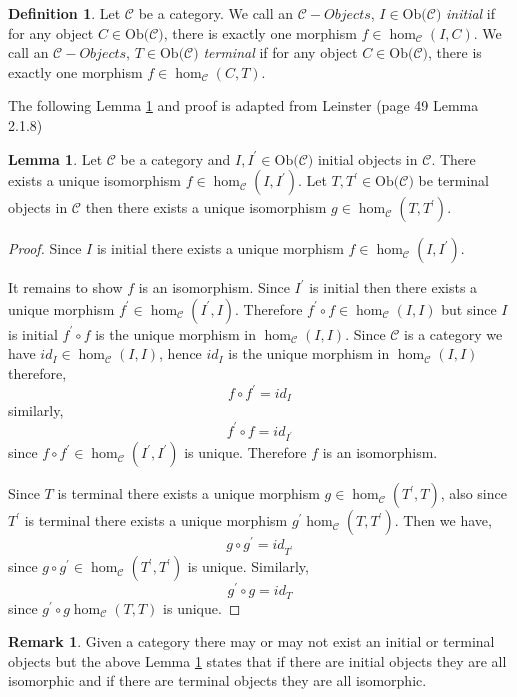 \documentclass[11pt,a4paper]{article}
\theoremstyle{definition}
\newtheorem{lemma}[thm]{Lemma}
\newtheorem{definition}[thm]{Definition}
\newtheorem{remark}[thm]{Remark}
\newcommand\ho[3][]{\hom_{#1}(#2,#3)}
\newcommand\ob[1]{\mathrm{Ob(}#1\mathrm{)}}
\newcommand\cat[1]{\mathscr{#1}}
\newcommand\objs[1]{#1-Objects}
\numberwithin{equation}{section}
\begin{document}
\begin{definition}
    \label{def:intermob}
    Let $\cat{C}$ be a category. We call an $\objs{\cat{C}}$, $I\in\ob{\cat{C}}$ \emph{initial} if for any object $C\in\ob{\cat{C}}$, there is exactly one morphism $f\in\ho[\cat{C}]{I}{C}$.  We call an $\objs{\cat{C}}$, $T\in\ob{\cat{C}}$ \emph{terminal} if for any object $C\in\ob{\cat{C}}$, there is exactly one morphism $f\in\ho[\cat{C}]{C}{T}$.
\end{definition}
The following Lemma \ref{lem:initialiso} and proof is adapted from Leinster \cite{Leinster} (page 49 Lemma 2.1.8)
\begin{lemma}
    \label{lem:initialiso} 
    Let $\cat{C}$ be a category and $I,I^\prime\in\ob{\cat{C}}$ initial objects in $\cat{C}$. There exists a unique isomorphism $f\in\ho[\cat{C}]{I}{I^\prime}$. Let $T,T^\prime\in\ob{\cat{C}}$ be terminal objects in $\cat{C}$ then there exists a unique isomorphism $g\in\ho[\cat{C}]{T}{T^\prime}$.
\end{lemma}
\begin{proof}
    Since $I$ is initial there exists a unique morphism $f\in\ho[\cat{C}]{I}{I^\prime}$. 
    
    It remains to show $f$ is an isomorphism. Since $I^\prime$ is initial then there exists a unique morphism $f^\prime\in\ho[\cat{C}]{I^\prime}{I}$. Therefore $f^\prime\circ f\in\ho[\cat{C}]{I}{I}$ but since $I$ is initial $f^\prime\circ f$ is the unique morphism in $\ho[\cat{C}]{I}{I}$. Since $\cat{C}$ is a category we have $id_{I}\in\ho[\cat{C}]{I}{I}$, hence $id_{I}$ is the unique morphism in $\ho[\cat{C}]{I}{I}$ therefore,
    \[f\circ f^\prime = id_{I}\]
    similarly,
    \[f^\prime\circ f = id_{I^\prime}\]
    since $f\circ f^\prime\in\ho[\cat{C}]{I^\prime}{I^\prime}$ is unique. Therefore $f$ is an isomorphism.
    
    Since $T$ is terminal there exists a unique morphism $g\in\ho[\cat{C}]{T^\prime}{T}$, also since $T^\prime$ is terminal there exists a unique morphism $g^\prime\ho[\cat{C}]{T}{T^\prime}$. Then we have,
    \[g\circ g^\prime = id_{T^\prime}\]
    since $g\circ g^\prime\in\ho[\cat{C}]{T^\prime}{T^\prime}$ is unique. Similarly, \[g^\prime\circ g = id_{T}\] since $g^\prime\circ g\ho[\cat{C}]{T}{T}$ is unique.
\end{proof}
\begin{remark}
    Given a category there may or may not exist an initial or terminal objects but the above Lemma \ref{lem:initialiso} states that if there are initial objects they are all isomorphic and if there are terminal objects they are all isomorphic.
\end{remark}
\end{document}
